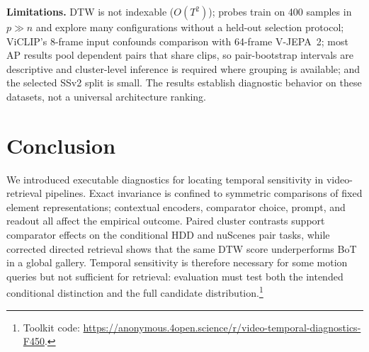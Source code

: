 \documentclass{article}
\theoremstyle{remark}
\begin{document}
\textbf{Limitations.} DTW is not indexable ($O(T^2)$); probes train on 400 samples in $p \gg n$ and explore many configurations without a held-out selection protocol; ViCLIP's 8-frame input confounds comparison with 64-frame V-JEPA~2; most AP results pool dependent pairs that share clips, so pair-bootstrap intervals are descriptive and cluster-level inference is required where grouping is available; and the selected SSv2 split is small. The results establish diagnostic behavior on these datasets, not a universal architecture ranking.


\section{Conclusion}

We introduced executable diagnostics for locating temporal sensitivity in video-retrieval pipelines. Exact invariance is confined to symmetric comparisons of fixed element representations; contextual encoders, comparator choice, prompt, and readout all affect the empirical outcome. Paired cluster contrasts support comparator effects on the conditional HDD and nuScenes pair tasks, while corrected directed retrieval shows that the same DTW score underperforms BoT in a global gallery. Temporal sensitivity is therefore necessary for some motion queries but not sufficient for retrieval: evaluation must test both the intended conditional distinction and the full candidate distribution.\footnote{Toolkit code: \url{https://anonymous.4open.science/r/video-temporal-diagnostics-F450}.}

\FloatBarrier  %
\end{document}
